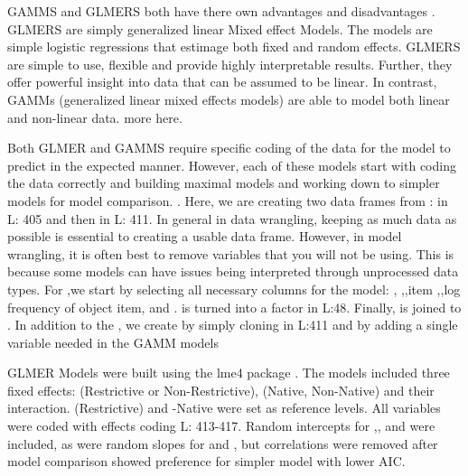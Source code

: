 GAMMS and GLMERS both have there own advantages and disadvantages \parencite{Ito_Knoeferle_2022}. GLMERS are simply generalized linear Mixed effect Models. The models are simple logistic regressions that estimage both fixed and random effects. GLMERS are simple to use, flexible and provide highly interpretable results. Further, they offer powerful insight into data that can be assumed to be linear. In contrast, GAMMs (generalized linear mixed effects models) are able to model both linear and non-linear data. more here.


Both GLMER and GAMMS require specific coding of the data for the model to predict in the expected manner. However, each of these models start with coding the data correctly and building maximal models and working down to simpler models for model comparison. \parencite{max model}. Here, we are creating two data frames from :  in L: 405 and then  in L: 411. In general in data wrangling, keeping as much data as possible is essential to creating a usable data frame. However, in model wrangling, it is often best to remove variables that you will not be using. This is because some models can have issues being interpreted through unprocessed data types. For ,we start by selecting all necessary columns for the model: , ,,item ,,log frequency of object item, and  .  is turned into a factor in L:48. Finally,  is joined to . In addition to the , we create  by simply cloning  in L:411 and by adding a single variable needed in the GAMM models



GLMER Models were built using the lme4 package \parencite{Bates2014-eq}. The models included three fixed effects:  (Restrictive or Non-Restrictive), (Native, Non-Native) and their interaction. (Restrictive) and -Native were set as reference levels. All variables were coded with
effects coding L: 413-417. Random intercepts for ,, and
 were included, as were random slopes for  and , but correlations were removed after model comparison showed preference for simpler model with lower AIC.







